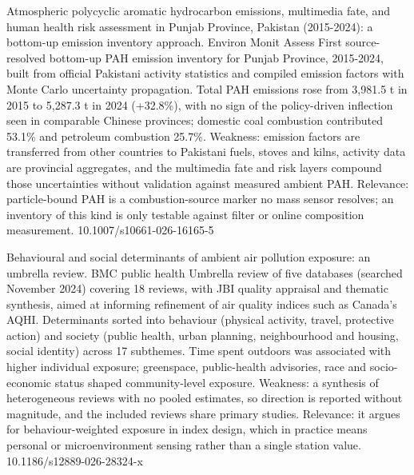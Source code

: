 \documentclass[10pt]{article}
\begin{document}
{Atmospheric polycyclic aromatic hydrocarbon emissions, multimedia fate, and human health risk assessment in Punjab Province, Pakistan (2015-2024): a bottom-up emission inventory approach.}
{Environ Monit Assess}
{First source-resolved bottom-up PAH emission inventory for Punjab Province, 2015-2024, built from official Pakistani activity statistics and compiled emission factors with Monte Carlo uncertainty propagation. Total PAH emissions rose from 3,981.5 t in 2015 to 5,287.3 t in 2024 (+32.8\%), with no sign of the policy-driven inflection seen in comparable Chinese provinces; domestic coal combustion contributed 53.1\% and petroleum combustion 25.7\%. Weakness: emission factors are transferred from other countries to Pakistani fuels, stoves and kilns, activity data are provincial aggregates, and the multimedia fate and risk layers compound those uncertainties without validation against measured ambient PAH. Relevance: particle-bound PAH is a combustion-source marker no mass sensor resolves; an inventory of this kind is only testable against filter or online composition measurement.}
{10.1007/s10661-026-16165-5}

{Behavioural and social determinants of ambient air pollution exposure: an umbrella review.}
{BMC public health}
{Umbrella review of five databases (searched November 2024) covering 18 reviews, with JBI quality appraisal and thematic synthesis, aimed at informing refinement of air quality indices such as Canada's AQHI. Determinants sorted into behaviour (physical activity, travel, protective action) and society (public health, urban planning, neighbourhood and housing, social identity) across 17 subthemes. Time spent outdoors was associated with higher individual exposure; greenspace, public-health advisories, race and socio-economic status shaped community-level exposure. Weakness: a synthesis of heterogeneous reviews with no pooled estimates, so direction is reported without magnitude, and the included reviews share primary studies. Relevance: it argues for behaviour-weighted exposure in index design, which in practice means personal or microenvironment sensing rather than a single station value.}
{10.1186/s12889-026-28324-x}
\end{document}
